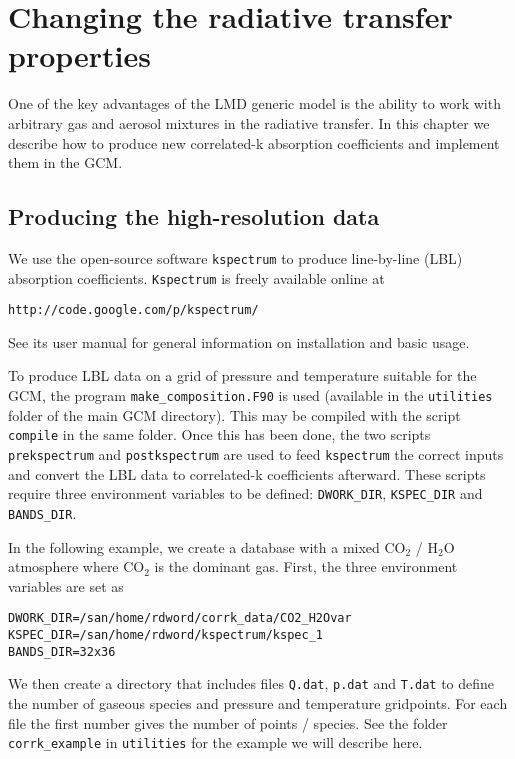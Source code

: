 \chapter{Changing the radiative transfer properties}

\label{sc:kspectrum}

One of the key advantages of the LMD generic model is the ability
to work with arbitrary gas and aerosol mixtures in the radiative transfer.
In this chapter we describe how to produce new correlated-k absorption coefficients
and implement them in the GCM.

\section{Producing the high-resolution data}
We use the open-source software {\tt kspectrum} to produce line-by-line (LBL) absorption coefficients. {\tt Kspectrum}
is freely available online at

\begin{verbatim}
http://code.google.com/p/kspectrum/
\end{verbatim}

See its user manual for general information on installation and basic usage.

To produce LBL data on a grid of pressure and temperature suitable for the GCM, the program \verb+make_composition.F90+ is used (available in the {\tt utilities} folder of the main GCM directory). This may be compiled with the script {\tt compile} in the same folder. Once this has been done, the two scripts \verb+prekspectrum+ and \verb+postkspectrum+ are used to feed {\tt kspectrum} the correct inputs and convert the LBL data to correlated-k coefficients afterward. These scripts require three environment variables to be defined: {\tt DWORK\_DIR}, {\tt KSPEC\_DIR} and {\tt BANDS\_DIR}.

In the following example, we create a database with a mixed CO$_2$ / H$_2$O atmosphere where CO$_2$ is the dominant gas. First, the three environment variables are set as

\begin{verbatim}
DWORK_DIR=/san/home/rdword/corrk_data/CO2_H2Ovar
KSPEC_DIR=/san/home/rdword/kspectrum/kspec_1
BANDS_DIR=32x36
\end{verbatim}

We then create a directory that includes files \verb+Q.dat+, \verb+p.dat+ and \verb+T.dat+ to define the number of gaseous species and pressure and temperature gridpoints. For each file the first number gives the number of points / species.   See the folder \verb+corrk_example+ in \verb+utilities+ for the example we will describe here.

